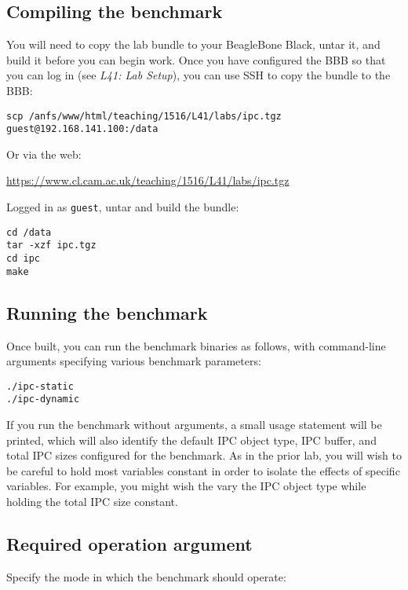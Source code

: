 \documentclass[a4paper,10pt]{article}
\begin{document}
\subsection*{Compiling the benchmark}

You will need to copy the lab bundle to your BeagleBone Black, untar it, and
build it before you can begin work.
Once you have configured the BBB so that you can log in (see \textit{L41: Lab
Setup}), you can use SSH to copy the bundle to the BBB:

\begin{verbatim}
scp /anfs/www/html/teaching/1516/L41/labs/ipc.tgz guest@192.168.141.100:/data
\end{verbatim}

\noindent
Or via the web:

\noindent
\url{https://www.cl.cam.ac.uk/teaching/1516/L41/labs/ipc.tgz}

\noindent
Logged in as \texttt{guest}, untar and build the bundle:

\begin{verbatim}
cd /data
tar -xzf ipc.tgz
cd ipc
make
\end{verbatim}

\subsection*{Running the benchmark}

Once built, you can run the benchmark binaries as follows, with command-line
arguments specifying various benchmark parameters:

\begin{verbatim}
./ipc-static
./ipc-dynamic
\end{verbatim}

If you run the benchmark without arguments, a small usage statement will be
printed, which will also identify the default IPC object type, IPC buffer, and
total IPC sizes configured for the benchmark.
As in the prior lab, you will wish to be careful to hold most variables
constant in order to isolate the effects of specific variables.
For example, you might wish the vary the IPC object type while holding the
total IPC size constant.

\subsection*{Required operation argument}

Specify the mode in which the benchmark should operate:
\end{document}
